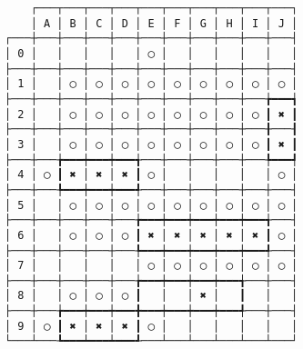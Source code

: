 {\scriptsize
\begin{verbatim}
    ┌───┬───┬───┬───┬───┬───┬───┬───┬───┬───┐
    │ A │ B │ C │ D │ E │ F │ G │ H │ I │ J │
┌───┼───┼───┼───┼───┼───┼───┼───┼───┼───┼───┤
│ 0 │   │   │   │   │ ◯ │   │   │   │   │   │
├───┼───┼───┼───┼───┼───┼───┼───┼───┼───┼───┤
│ 1 │   │ ◯ │ ◯ │ ◯ │ ◯ │ ◯ │ ◯ │ ◯ │ ◯ │ ◯ │
├───┼───┼───┼───┼───┼───┼───┼───┼───┼───╆━━━┪
│ 2 │   │ ◯ │ ◯ │ ◯ │ ◯ │ ◯ │ ◯ │ ◯ │ ◯ ┃ ✖ ┃
├───┼───┼───┼───┼───┼───┼───┼───┼───┼───╂───┨
│ 3 │   │ ◯ │ ◯ │ ◯ │ ◯ │ ◯ │ ◯ │ ◯ │ ◯ ┃ ✖ ┃
├───┼───╆━━━┿━━━┿━━━╅───┼───┼───┼───┼───╄━━━┩
│ 4 │ ◯ ┃ ✖ │ ✖ │ ✖ ┃ ◯ │   │   │   │   │ ◯ │
├───┼───╄━━━┿━━━┿━━━╃───┼───┼───┼───┼───┼───┤
│ 5 │   │ ◯ │ ◯ │ ◯ │ ◯ │ ◯ │ ◯ │ ◯ │ ◯ │ ◯ │
├───┼───┼───┼───┼───╆━━━┿━━━┿━━━┿━━━┿━━━╅───┤
│ 6 │   │ ◯ │ ◯ │ ◯ ┃ ✖ │ ✖ │ ✖ │ ✖ │ ✖ ┃ ◯ │
├───┼───┼───┼───┼───╄━━━┿━━━┿━━━┿━━━┿━━━╃───┤
│ 7 │   │   │   │   │ ◯ │ ◯ │ ◯ │ ◯ │ ◯ │ ◯ │
├───┼───┼───┼───┼───╆━━━┿━━━┿━━━┿━━━╅───┼───┤
│ 8 │   │ ◯ │ ◯ │ ◯ ┃   │   │ ✖ │   ┃   │   │
├───┼───╆━━━┿━━━┿━━━╋━━━┿━━━┿━━━┿━━━╃───┼───┤
│ 9 │ ◯ ┃ ✖ │ ✖ │ ✖ ┃ ◯ │   │   │   │   │   │
└───┴───┺━━━┷━━━┷━━━┹───┴───┴───┴───┴───┴───┘


\end{verbatim}}
